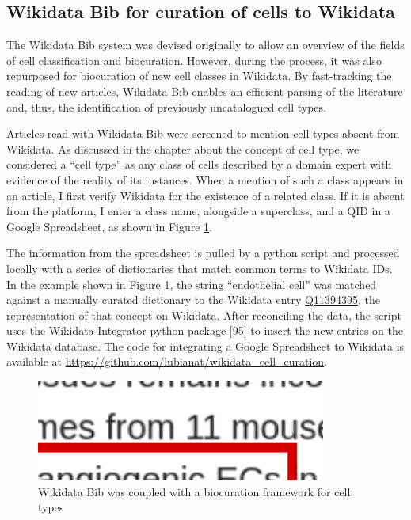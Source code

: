 \hypertarget{wikidata-bib-for-curation-of-cells-to-wikidata}{%
\subsection{Wikidata Bib for curation of cells to Wikidata}\label{wikidata-bib-for-curation-of-cells-to-wikidata}}

The Wikidata Bib system was devised originally to allow an overview of the fields of cell classification and biocuration.
However, during the process, it was also repurposed for biocuration of new cell classes in Wikidata.
By fast-tracking the reading of new articles, Wikidata Bib enables an efficient parsing of the literature and, thus, the identification of previously uncatalogued cell types.

Articles read with Wikidata Bib were screened to mention cell types absent from Wikidata.
As discussed in the chapter about the concept of cell type, we considered a ``cell type'' as any class of cells described by a domain expert with evidence of the reality of its instances.
When a mention of such a class appears in an article, I first verify Wikidata for the existence of a related class.
If it is absent from the platform, I enter a class name, alongside a superclass, and a QID in a Google Spreadsheet, as shown in Figure \ref{fig:biocuration_of_cells}.

The information from the spreadsheet is pulled by a python script and processed locally with a series of dictionaries that match common terms to Wikidata IDs.
In the example shown in Figure \ref{fig:biocuration_of_cells}, the string ``endothelial cell'' was matched against a manually curated dictionary to the Wikidata entry \href{https://www.wikidata.org/wiki/Q11394395}{Q11394395}, the representation of that concept on Wikidata.
After reconciling the data, the script uses the Wikidata Integrator python package {[}\protect\hyperlink{ref-qDI8I4IJ}{95}{]} to insert the new entries on the Wikidata database.
The code for integrating a Google Spreadsheet to Wikidata is available at \url{https://github.com/lubianat/wikidata_cell_curation}.

\begin{figure}
\hypertarget{fig:biocuration_of_cells}{%
\centering
\includegraphics[width=0.85\textwidth,height=\textheight]{images/biocuration_of_cells.png}
\caption{Wikidata Bib was coupled with a biocuration framework for cell types}\label{fig:biocuration_of_cells}
}
\end{figure}


